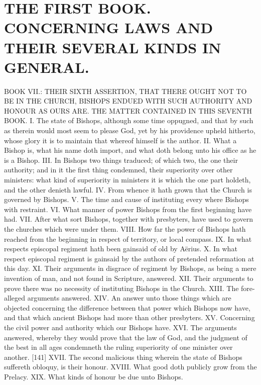 \chapter*[The First Book]{THE FIRST BOOK. 
CONCERNING LAWS AND THEIR SEVERAL KINDS IN GENERAL.}
\label{chap:book1}

BOOK VII.: THEIR SIXTH ASSERTION, THAT THERE OUGHT NOT TO BE IN THE CHURCH, BISHOPS ENDUED WITH SUCH AUTHORITY AND HONOUR AS OURS ARE.
THE MATTER CONTAINED IN THIS SEVENTH BOOK.
I. The state of Bishops, although some time oppugned, and that by such as therein would most seem to please God, yet by his providence upheld hitherto, whose glory it is to maintain that whereof himself is the author.
II. What a Bishop is, what his name doth import, and what doth belong unto his office as he is a Bishop.
III. In Bishops two things traduced; of which two, the one their authority; and in it the first thing condemned, their superiority over other ministers: what kind of superiority in ministers it is which the one part holdeth, and the other denieth lawful.
IV. From whence it hath grown that the Church is governed by Bishops.
V. The time and cause of instituting every where Bishops with restraint.
VI. What manner of power Bishops from the first beginning have had.
VII. After what sort Bishops, together with presbyters, have used to govern the churches which were under them.
VIII. How far the power of Bishops hath reached from the beginning in respect of territory, or local compass.
IX. In what respects episcopal regiment hath been gainsaid of old by Aërius.
X. In what respect episcopal regiment is gainsaid by the authors of pretended reformation at this day.
XI. Their arguments in disgrace of regiment by Bishops, as being a mere invention of man, and not found in Scripture, answered.
XII. Their arguments to prove there was no necessity of instituting Bishops in the Church.
XIII. The fore-alleged arguments answered.
XIV. An answer unto those things which are objected concerning the difference between that power which Bishops now have, and that which ancient Bishops had more than other presbyters.
XV. Concerning the civil power and authority which our Bishops have.
XVI. The arguments answered, whereby they would prove that the law of God, and the judgment of the best in all ages condemneth the ruling superiority of one minister over another. [141]
XVII. The second malicious thing wherein the state of Bishops suffereth obloquy, is their honour.
XVIII. What good doth publicly grow from the Prelacy.
XIX. What kinds of honour be due unto Bishops.
